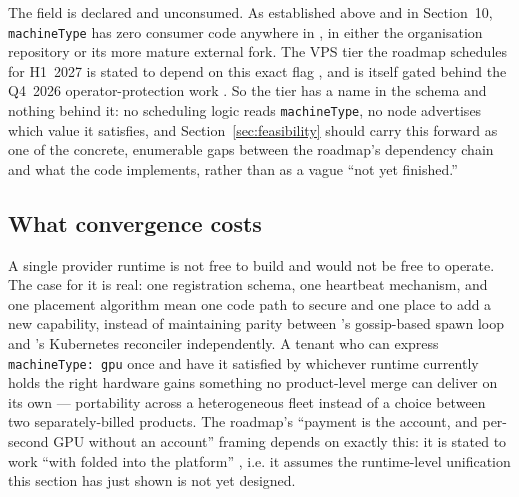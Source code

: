 The field is declared and unconsumed. As established above and in Section~10, \texttt{machineType}
has zero consumer code anywhere in \FluxOS, in either the organisation repository or its more mature
external fork. The VPS tier the roadmap schedules for H1~2027 is stated to depend on this exact flag
, and is itself gated behind the Q4~2026 operator-protection
work . So the tier has a name in the schema and nothing behind
it: no scheduling logic reads \texttt{machineType}, no node advertises which value it satisfies, and
 Section~\ref{sec:feasibility} should carry this forward as one of the concrete, enumerable gaps between
the roadmap's dependency chain and what the code implements, rather than as a vague ``not yet
finished.''

\subsection{What convergence costs}

A single provider runtime is not free to build and would not be free to operate. The case for it is
real: one registration schema, one heartbeat mechanism, and one placement algorithm mean one code
path to secure and one place to add a new capability, instead of maintaining parity between \FluxOS's
gossip-based spawn loop and \FluxEdge's Kubernetes reconciler independently. A tenant who can express
\texttt{machine\allowbreak{}Type:\allowbreak{}~gpu} once and have it satisfied by whichever runtime currently holds the right
hardware gains something no product-level merge can deliver on its own — portability across a
heterogeneous fleet instead of a choice between two separately-billed products. The roadmap's ``payment
is the account, and per-second GPU without an account'' framing depends on exactly this: it is stated
to work ``with \FluxEdge folded into the platform'' , i.e. it
assumes the runtime-level unification this section has just shown is not yet designed.

